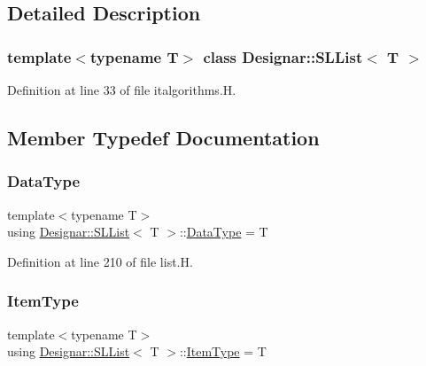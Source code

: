 \subsection{Detailed Description}
\subsubsection*{template$<$typename T$>$\newline
class Designar\+::\+S\+L\+List$<$ T $>$}



Definition at line 33 of file italgorithms.\+H.



\subsection{Member Typedef Documentation}
\mbox{\label{class_designar_1_1_s_l_list_aa98659227d90b392a1b52fa5e9b292f4}} 
\subsubsection{\texorpdfstring{Data\+Type}{DataType}}
{\footnotesize\ttfamily template$<$typename T$>$ \\
using \hyperlink{class_designar_1_1_s_l_list}{Designar\+::\+S\+L\+List}$<$ T $>$\+::\hyperlink{class_designar_1_1_s_l_list_aa98659227d90b392a1b52fa5e9b292f4}{Data\+Type} =  T}



Definition at line 210 of file list.\+H.

\mbox{\label{class_designar_1_1_s_l_list_a8ec47bfb6b0d74c8f85111b7b3c05cb2}} 
\subsubsection{\texorpdfstring{Item\+Type}{ItemType}}
{\footnotesize\ttfamily template$<$typename T$>$ \\
using \hyperlink{class_designar_1_1_s_l_list}{Designar\+::\+S\+L\+List}$<$ T $>$\+::\hyperlink{class_designar_1_1_s_l_list_a8ec47bfb6b0d74c8f85111b7b3c05cb2}{Item\+Type} =  T}



